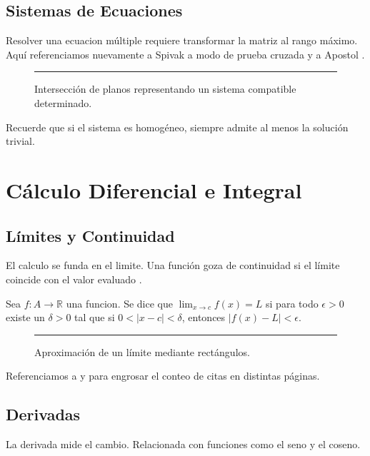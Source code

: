 	\section{Sistemas de Ecuaciones}
	Resolver una \gls{ecuacion} múltiple requiere transformar la matriz al \gls{rango} máximo. Aquí referenciamos nuevamente a Spivak \cite{spivak} a modo de prueba cruzada y a Apostol \cite{apostol}.
	
	\begin{figure}[h]
		\centering
		\rule{4cm}{4cm} %
		\caption{Intersección de planos representando un sistema compatible determinado.}
	\end{figure}
	
	\begin{nota}
		Recuerde que si el sistema es homogéneo, siempre admite al menos la solución trivial.
	\end{nota}
	
	\chapter{Cálculo Diferencial e Integral}
	
	\section{Límites y Continuidad}
	El \gls{calculo} se funda en el \gls{limite}. Una función goza de \gls{continuidad} si el límite coincide con el valor evaluado \cite{stewart}. 
	
	\begin{definition}[Límite]
		Sea $f: A \to \mathbb{R}$ una \gls{funcion}. Se dice que $\lim_{x \to c} f(x) = L$ si para todo $\epsilon > 0$ existe un $\delta > 0$ tal que si $0 < |x - c| < \delta$, entonces $|f(x) - L| < \epsilon$.
	\end{definition}
	
	\begin{figure}[h]
		\centering
		\rule{5cm}{3cm}
		\caption{Aproximación de un límite mediante rectángulos.}
	\end{figure}
	
	Referenciamos a \cite{strang} y \cite{spivak} para engrosar el conteo de citas en distintas páginas.
	
	\section{Derivadas}
	La \gls{derivada} mide el cambio. Relacionada con funciones como el \gls{seno} y el \gls{coseno}.
	
